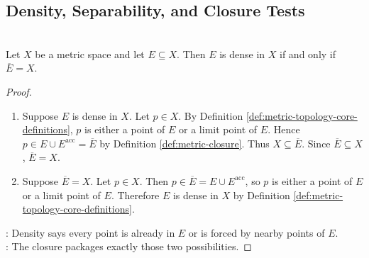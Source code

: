 \subsection{Density, Separability, and Closure Tests}

\begin{proposition} \label{prop:dense-closure-criterion} \\
Let $X$ be a metric space and let $E\subseteq X$. Then $E$ is dense in $X$ if and only if $\overline{E}=X$.
\begin{proof}
\begin{enumerate}[label=\roman*.]
\setlength{\itemsep}{0pt}
\item[$(\Rightarrow)$] Suppose $E$ is dense in $X$. Let $p\in X$. By Definition \ref{def:metric-topology-core-definitions}, $p$ is either a point of $E$ or a limit point of $E$. Hence $p\in E\cup E^{\operatorname{acc}}=\overline{E}$ by Definition \ref{def:metric-closure}. Thus $X\subseteq\overline{E}$. Since $\overline{E}\subseteq X$, $\overline{E}=X$.
\item[$(\Leftarrow)$] Suppose $\overline{E}=X$. Let $p\in X$. Then $p\in\overline{E}=E\cup E^{\operatorname{acc}}$, so $p$ is either a point of $E$ or a limit point of $E$. Therefore $E$ is dense in $X$ by Definition \ref{def:metric-topology-core-definitions}.
\end{enumerate}
: Density says every point is already in $E$ or is forced by nearby points of $E$.\\
: The closure packages exactly those two possibilities.
\end{proof}
\end{proposition}

